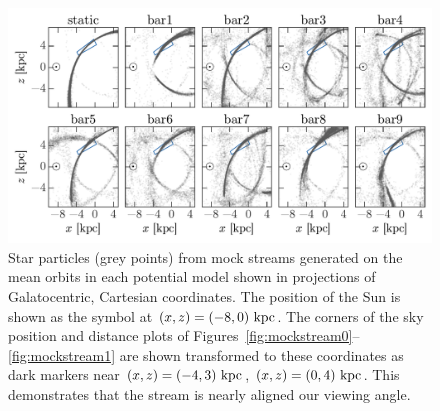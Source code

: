 \documentclass[letterpaper,12pt,preprint]{aastex}
\begin{document}
\begin{figure}[p]
\begin{center}
\includegraphics[width=\textwidth]{figures/mockstream-xyz}
\caption{ Star particles (grey points) from mock streams generated on the mean orbits in each potential model shown in projections of Galatocentric, Cartesian coordinates. The position of the Sun is shown as the symbol at $(x,z)=(-8,0)~{\rm kpc}$. The corners of the sky position and distance plots of Figures~\ref{fig:mockstream0}--\ref{fig:mockstream1} are shown transformed to these coordinates as dark markers near $(x,z)=(-4,3)~{\rm kpc}$, $(x,z)=(0,4)~{\rm kpc}$. This demonstrates that the stream is nearly aligned our viewing angle. }
\label{fig:mockstreamxyz}
\end{center}
\end{figure}





\appendix
\end{document}
